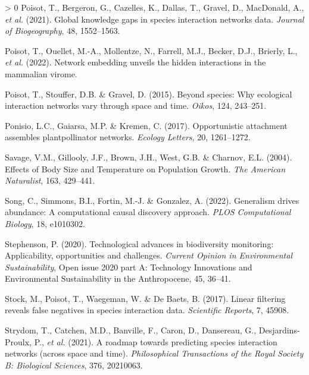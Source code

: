 \documentclass[11pt]{article}
\newlength{\cslhangindent}
\newenvironment{CSLReferences}[3] %
 {%
  \setlength{\parindent}{0pt}
  \ifodd #1 \everypar{\setlength{\hangindent}{\cslhangindent}}\ignorespaces\fi
  \ifnum #2 > 0
  \setlength{\parskip}{#2\baselineskip}
  \fi
 }%
 {}
\begin{document}
\begin{CSLReferences}{1}{0}
\leavevmode\hypertarget{ref-Poisot2021GloKno}{}%
Poisot, T., Bergeron, G., Cazelles, K., Dallas, T., Gravel, D.,
MacDonald, A., \emph{et al.} (2021). Global knowledge gaps in species
interaction networks data. \emph{Journal of Biogeography}, 48,
1552--1563.

\leavevmode\hypertarget{ref-Poisot2022NetEmb}{}%
Poisot, T., Ouellet, M.-A., Mollentze, N., Farrell, M.J., Becker, D.J.,
Brierly, L., \emph{et al.} (2022). Network embedding unveils the hidden
interactions in the mammalian virome.

\leavevmode\hypertarget{ref-Poisot2015SpeWhy}{}%
Poisot, T., Stouffer, D.B. \& Gravel, D. (2015). Beyond species: Why
ecological interaction networks vary through space and time.
\emph{Oikos}, 124, 243--251.

\leavevmode\hypertarget{ref-Ponisio2017OppAtt}{}%
Ponisio, L.C., Gaiarsa, M.P. \& Kremen, C. (2017). Opportunistic
attachment assembles plantpollinator networks. \emph{Ecology Letters},
20, 1261--1272.

\leavevmode\hypertarget{ref-Savage2004EffBod}{}%
Savage, V.M., Gillooly, J.F., Brown, J.H., West, G.B. \& Charnov, E.L.
(2004). Effects of Body Size and Temperature on Population Growth.
\emph{The American Naturalist}, 163, 429--441.

\leavevmode\hypertarget{ref-Song2022GenDri}{}%
Song, C., Simmons, B.I., Fortin, M.-J. \& Gonzalez, A. (2022).
Generalism drives abundance: A computational causal discovery approach.
\emph{PLOS Computational Biology}, 18, e1010302.

\leavevmode\hypertarget{ref-Stephenson2020TecAdv}{}%
Stephenson, P. (2020). Technological advances in biodiversity
monitoring: Applicability, opportunities and challenges. \emph{Current
Opinion in Environmental Sustainability}, Open issue 2020 part A:
Technology Innovations and Environmental Sustainability in the
Anthropocene, 45, 36--41.

\leavevmode\hypertarget{ref-Stock2017LinFil}{}%
Stock, M., Poisot, T., Waegeman, W. \& De Baets, B. (2017). Linear
filtering reveals false negatives in species interaction data.
\emph{Scientific Reports}, 7, 45908.

\leavevmode\hypertarget{ref-Strydom2021RoaPre}{}%
Strydom, T., Catchen, M.D., Banville, F., Caron, D., Dansereau, G.,
Desjardins-Proulx, P., \emph{et al.} (2021). A roadmap towards
predicting species interaction networks (across space and time).
\emph{Philosophical Transactions of the Royal Society B: Biological
Sciences}, 376, 20210063.


\end{CSLReferences}
\end{document}
